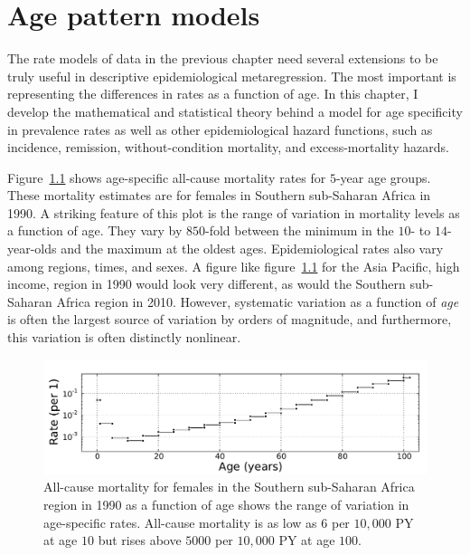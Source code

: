 \chapter{Age pattern models}
\label{theory-age_pattern_model}
The rate models of data in the previous chapter need several
extensions to be truly useful in descriptive epidemiological
metaregression.  The most important is representing the differences in
rates as a function of age.  In this chapter, I develop the
mathematical and statistical theory behind a model for age specificity
in prevalence rates as well as other epidemiological hazard functions,
such as incidence, remission, without-condition mortality, and
excess-mortality hazards.

Figure~\ref{ssas-mx_female_1990} shows age-specific all-cause
mortality rates for $5$-year age groups.  These mortality estimates are
for females in Southern sub-Saharan Africa in 1990.  A striking
feature of this plot is the range of variation in mortality levels as
a function of age.  They vary by $850$-fold between the minimum
in the $10$- to $14$-year-olds and the maximum at the oldest
ages. Epidemiological rates also vary among regions, times, and
sexes.  A figure like figure~\ref{ssas-mx_female_1990} for the Asia Pacific,
high income, region in 1990 would look very different, as
would the Southern sub-Saharan Africa region in 2010. However,
systematic variation as a function of \emph{age} is often the largest
source of variation by orders of magnitude, and furthermore, this
variation is often distinctly nonlinear.

\begin{figure}[h]
\begin{center}
\includegraphics[width=\textwidth]{ssas-mx_female_1990.pdf}
\caption{All-cause mortality for females in the Southern sub-Saharan Africa
  region in 1990 as a function of age shows the range of
  variation in age-specific rates.  All-cause mortality is as low as $6$ per
  $10,000$ PY at age $10$ but rises above $5000$ per $10,000$ PY at age $100$.}
\label{ssas-mx_female_1990}
\end{center}
\end{figure}

